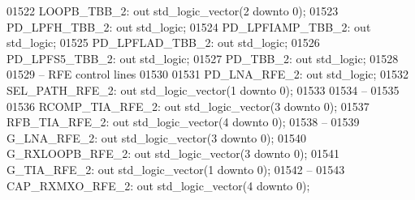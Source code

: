 \begin{DoxyCode}
01522         LOOPB\_TBB\_2:    \textcolor{keywordflow}{out} \textcolor{comment}{std\_logic\_vector}(\textcolor{vhdllogic}{}\textcolor{vhdllogic}{2} \textcolor{keywordflow}{downto} \textcolor{vhdllogic}{}\textcolor{vhdllogic}{0});
01523         PD\_LPFH\_TBB\_2:  \textcolor{keywordflow}{out} \textcolor{comment}{std\_logic};
01524         PD\_LPFIAMP\_TBB\_2:   \textcolor{keywordflow}{out} \textcolor{comment}{std\_logic};
01525         PD\_LPFLAD\_TBB\_2:    \textcolor{keywordflow}{out} \textcolor{comment}{std\_logic};
01526         PD\_LPFS5\_TBB\_2: \textcolor{keywordflow}{out} \textcolor{comment}{std\_logic};
01527         PD\_TBB\_2:       \textcolor{keywordflow}{out} \textcolor{comment}{std\_logic};
01528 
01529 \textcolor{keyword}{        -- RFE control lines}
01530         
01531         PD\_LNA\_RFE\_2:       \textcolor{keywordflow}{out} \textcolor{comment}{std\_logic};
01532         SEL\_PATH\_RFE\_2:     \textcolor{keywordflow}{out} \textcolor{comment}{std\_logic\_vector}(\textcolor{vhdllogic}{}\textcolor{vhdllogic}{1} \textcolor{keywordflow}{downto} \textcolor{vhdllogic}{}\textcolor{vhdllogic}{0});
01533         
01534 \textcolor{keyword}{        --}
01535         
01536         RCOMP\_TIA\_RFE\_2:    \textcolor{keywordflow}{out} \textcolor{comment}{std\_logic\_vector}(\textcolor{vhdllogic}{}\textcolor{vhdllogic}{3} \textcolor{keywordflow}{downto} \textcolor{vhdllogic}{}\textcolor{vhdllogic}{0});
01537         RFB\_TIA\_RFE\_2:  \textcolor{keywordflow}{out} \textcolor{comment}{std\_logic\_vector}(\textcolor{vhdllogic}{}\textcolor{vhdllogic}{4} \textcolor{keywordflow}{downto} \textcolor{vhdllogic}{}\textcolor{vhdllogic}{0});
01538 \textcolor{keyword}{        --}
01539         G\_LNA\_RFE\_2:    \textcolor{keywordflow}{out} \textcolor{comment}{std\_logic\_vector}(\textcolor{vhdllogic}{}\textcolor{vhdllogic}{3} \textcolor{keywordflow}{downto} \textcolor{vhdllogic}{}\textcolor{vhdllogic}{0});
01540         G\_RXLOOPB\_RFE\_2:    \textcolor{keywordflow}{out} \textcolor{comment}{std\_logic\_vector}(\textcolor{vhdllogic}{}\textcolor{vhdllogic}{3} \textcolor{keywordflow}{downto} \textcolor{vhdllogic}{}\textcolor{vhdllogic}{0});
01541         G\_TIA\_RFE\_2:    \textcolor{keywordflow}{out} \textcolor{comment}{std\_logic\_vector}(\textcolor{vhdllogic}{}\textcolor{vhdllogic}{1} \textcolor{keywordflow}{downto} \textcolor{vhdllogic}{}\textcolor{vhdllogic}{0});
01542 \textcolor{keyword}{        --}
01543         CAP\_RXMXO\_RFE\_2:    \textcolor{keywordflow}{out} \textcolor{comment}{std\_logic\_vector}(\textcolor{vhdllogic}{}\textcolor{vhdllogic}{4} \textcolor{keywordflow}{downto} \textcolor{vhdllogic}{}\textcolor{vhdllogic}{0});

\end{DoxyCode}
